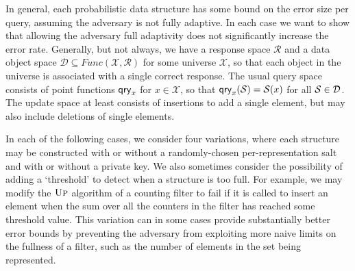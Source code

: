 In general, each probabilistic data structure has some bound on the error size per query, assuming the adversary is not fully adaptive. In each case we want to show that allowing the adversary full adaptivity does not significantly increase the error rate. Generally, but not always, we have a response space $\mathcal{R}$ and a data object space $\mathcal{D} \subseteq Func(\mathcal{X},\mathcal{R})$ for some universe $\mathcal{X}$, so that each object in the universe is associated with a single correct response. The usual query space consists of point functions $\mathsf{qry}_x$ for $x \in \mathcal{X}$, so that $\mathsf{qry}_x(\mathcal{S}) = \mathcal{S}(x)$  for all $\mathcal{S} \in \mathcal{D}$. The update space at least consists of insertions to add a single element, but may also include deletions of single elements.

In each of the following cases, we consider four variations, where each structure may be constructed with or without a randomly-chosen per-representation salt and with or without a private key. We also sometimes consider the possibility of adding a `threshold' to detect when a structure is too full. For example, we may modify the $\textsc{Up}$ algorithm of a counting filter to fail if it is called to insert an element when the sum over all the counters in the filter has reached some threshold value. This variation can in some cases provide substantially better error bounds by preventing the adversary from exploiting more naive limits on the fullness of a filter, such as the number of elements in the set being represented.

